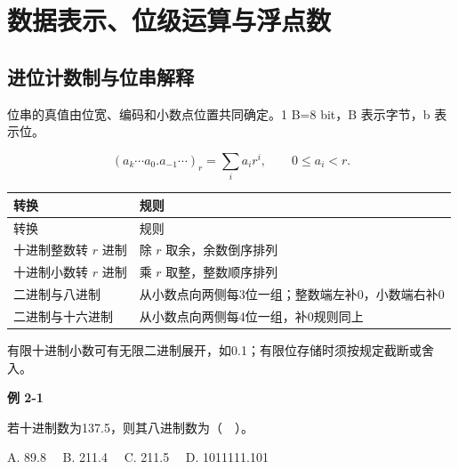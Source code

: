 \chapter{数据表示、位级运算与浮点数}\label{CO02}

\section{进位计数制与位串解释}\label{CO02-radix}

位串的真值由位宽、编码和小数点位置共同确定。1 B=8 bit，B 表示字节，b 表示位。

\[ (a_k\cdots a_0.a_{-1}\cdots)_r=\sum_i a_i r^i,\qquad 0\le a_i<r.\]

\par\smallskip
{\fontsize{9.3}{12}\selectfont\setlength{\tabcolsep}{2.5pt}\setlength{\LTleft}{0pt}\setlength{\LTright}{0pt}
\begin{longtable}{@{}>{\raggedright\arraybackslash}p{}>{\raggedright\arraybackslash}p{}@{}}
\toprule
转换 & 规则 \\

\midrule\endfirsthead\toprule
转换 & 规则 \\

\midrule\endhead\bottomrule\endfoot
十进制整数转 \(r\) 进制 & 除 \(r\) 取余，余数倒序排列 \\

十进制小数转 \(r\) 进制 & 乘 \(r\) 取整，整数顺序排列 \\

二进制与八进制 & 从小数点向两侧每3位一组；整数端左补0，小数端右补0 \\

二进制与十六进制 & 从小数点向两侧每4位一组，补0规则同上 \\

\end{longtable}}
\par\smallskip

有限十进制小数可有无限二进制展开，如0.1；有限位存储时须按规定截断或舍入。

\par\medskip{}\noindent\hypertarget{CO02-E01}{}\label{CO02-E01}\textbf{例 2-1}\par\nobreak\smallskip

若十进制数为137.5，则其八进制数为（　）。

A. 89.8　 B. 211.4　 C. 211.5　 D. 1011111.101

